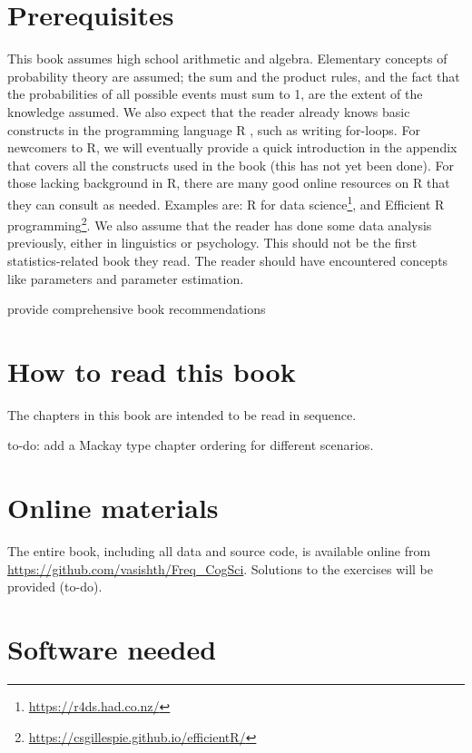 \documentclass[12pt,]{krantz}
\makeatletter
\renewcommand{\href}[2]{#2\footnote{\url{#1}}}
\newenvironment{kframe}{%
\medskip{}
\setlength{\fboxsep}{.8em}
 \def\at@end@of@kframe{}%
 \ifinner\ifhmode%
  \def\at@end@of@kframe{\end{minipage}}%
  \begin{minipage}{\columnwidth}%
 \fi\fi%
 \def\FrameCommand##1{\hskip\@totalleftmargin \hskip-\fboxsep
 \colorbox{shadecolor}{##1}\hskip-\fboxsep
     \hskip-\linewidth \hskip-\@totalleftmargin \hskip\columnwidth}%
 \MakeFramed {\advance\hsize-\width
   \@totalleftmargin\z@ \linewidth\hsize
   \@setminipage}}%
 {\par\unskip\endMakeFramed%
 \at@end@of@kframe}
\newenvironment{rmdblock}[1]
  {
  \begin{itemize}
  \renewcommand{\labelitemi}{
    \raisebox{-.7\height}[0pt][0pt]{
      {\setkeys{Gin}{width=3em,keepaspectratio}\texttt{[image: images/\#1]}}
    }
  }
  \setlength{\fboxsep}{1em}
  \begin{kframe}
  \item
  }
  {
  \end{kframe}
  \end{itemize}
  }
\newenvironment{rmdnote}
  {\begin{rmdblock}{note}}
  {\end{rmdblock}}
\makeatother
\begin{document}
\hypertarget{prerequisites}{%
\section{Prerequisites}\label{prerequisites}}

This book assumes high school arithmetic and algebra. Elementary concepts of probability theory are assumed; the sum and the product rules, and the fact that the probabilities of all possible events must sum to 1, are the extent of the knowledge assumed. We also expect that the reader already knows basic constructs in the programming language R \citep{R-base}, such as writing for-loops. For newcomers to R, we will eventually provide a quick introduction in the appendix that covers all the constructs used in the book (this has not yet been done). For those lacking background in R, there are many good online resources on R that they can consult as needed. Examples are: \href{https://r4ds.had.co.nz/}{R for data science}, and \href{https://csgillespie.github.io/efficientR/}{Efficient R programming}. We also assume that the reader has done some data analysis previously, either in linguistics or psychology. This should not be the first statistics-related book they read. The reader should have encountered concepts like parameters and parameter estimation.

\begin{rmdnote}
provide comprehensive book recommendations
\end{rmdnote}

\hypertarget{how-to-read-this-book}{%
\section{How to read this book}\label{how-to-read-this-book}}

The chapters in this book are intended to be read in sequence.

to-do: add a Mackay type chapter ordering for different scenarios.

\hypertarget{online-materials}{%
\section{Online materials}\label{online-materials}}

The entire book, including all data and source code, is available online from \url{https://github.com/vasishth/Freq_CogSci}. Solutions to the exercises will be provided (to-do).

\hypertarget{software-needed}{%
\section{Software needed}\label{software-needed}}
\end{document}
